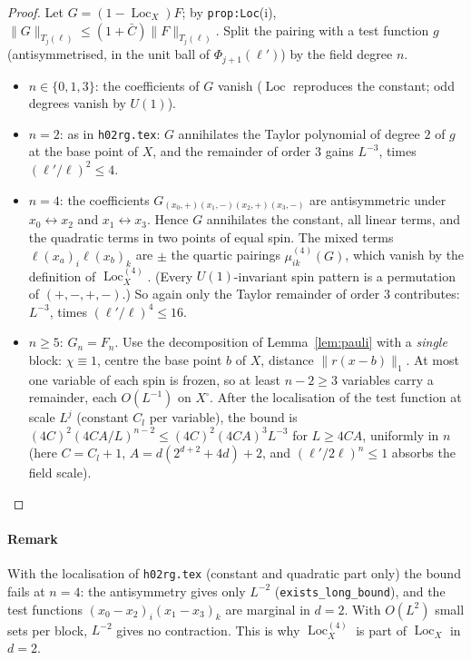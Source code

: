 \documentclass[11pt]{amsart}
\theoremstyle{definition}
\theoremstyle{remark}
\numberwithin{equation}{section}
\newcommand{\Loc}{\operatorname{Loc}}
\newcommand{\hr}{\texttt{h02rg.tex}}
\begin{document}
\begin{proof}
Let $G=(1-\Loc_X)F$; by \texttt{prop:Loc}(i), $\|G\|_{T_j(\ell)}\le(1+\bar C)\|F\|_{T_j(\ell)}$.
Split the pairing with a test function $g$ (antisymmetrised, in the unit ball of
$\Phi_{j+1}(\ell')$) by the field degree $n$.
\begin{itemize}
\item $n\in\{0,1,3\}$: the coefficients of $G$ vanish ($\Loc$ reproduces the constant; odd
  degrees vanish by $U(1)$).
\item $n=2$: as in \hr{}: $G$ annihilates the Taylor polynomial of degree $2$ of $g$ at the base
  point of $X$, and the remainder of order $3$ gains $L^{-3}$, times $(\ell'/\ell)^2\le4$.
\item $n=4$: the coefficients $G_{(x_0,+)(x_1,-)(x_2,+)(x_3,-)}$ are antisymmetric under
  $x_0\leftrightarrow x_2$ and $x_1\leftrightarrow x_3$. Hence $G$ annihilates the constant,
  all linear terms, and the quadratic terms in two points of equal spin. The mixed terms
  $\ell(x_a)_i\ell(x_b)_k$ are $\pm$ the quartic pairings $\mu^{(4)}_{ik}(G)$, which vanish by
  the definition of $\Loc^{(4)}_X$. (Every $U(1)$-invariant spin pattern is a permutation of
  $(+,-,+,-)$.) So again only the Taylor remainder of order $3$ contributes: $L^{-3}$, times
  $(\ell'/\ell)^4\le16$.
\item $n\ge5$: $G_n=F_n$. Use the decomposition of Lemma~\ref{lem:pauli} with a \emph{single}
  block: $\chi\equiv1$, centre the base point $b$ of $X$, distance $\|r(x-b)\|_1$. At most one
  variable of each spin is frozen, so at least $n-2\ge3$ variables carry a remainder, each
  $O(L^{-1})$ on $X^\square$. After the localisation of the test function at scale $L^j$
  (constant $C_l$ per variable), the bound is
  $(4C)^2(4CA/L)^{n-2}\le(4C)^2(4CA)^3L^{-3}$ for $L\ge4CA$, uniformly in $n$ (here
  $C=C_l+1$, $A=d(2^{d+2}+4d)+2$, and $(\ell'/2\ell)^n\le1$ absorbs the field scale).
\end{itemize}
\end{proof}

\paragraph{Remark}
With the localisation of \hr{} (constant and quadratic part only) the bound fails at $n=4$:
the antisymmetry gives only $L^{-2}$ (\texttt{exists\_long\_bound}), and the test functions
$(x_0-x_2)_i(x_1-x_3)_k$ are marginal in $d=2$. With $O(L^2)$ small sets per block, $L^{-2}$
gives no contraction. This is why $\Loc^{(4)}_X$ is part of $\Loc_X$ in $d=2$.
\end{document}
